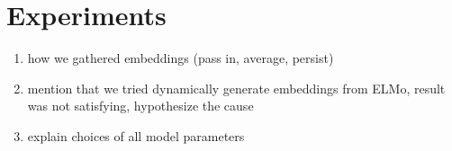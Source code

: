 \section{Experiments}
\label{sec: exp}

\begin{enumerate}
\item how we gathered embeddings (pass in, average, persist)
\item mention that we tried dynamically generate embeddings from ELMo, result was not satisfying, hypothesize the cause
\item explain choices of all model parameters
\end{enumerate}

